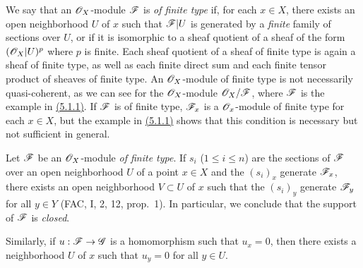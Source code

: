 \begin{env}[5.2.1]
\label{env-0.5.2.1}
We say that an $\mathscr{O}_X$-module $\mathscr{F}$ is {\em of finite type} if, for each $x\in X$, there
exists an open neighborhood $U$ of $x$ such that $\mathscr{F}|U$ is generated by a {\em finite}
family of sections over $U$, or if it is isomorphic to a sheaf quotient of a sheaf of the
form $(\mathscr{O}_X|U)^p$ where $p$ is finite. Each sheaf quotient of a sheaf of finite type is
again a sheaf of finite type, as well as each finite direct sum and each finite tensor
product of sheaves of finite type. An $\mathscr{O}_X$-module of finite type is not necessarily
quasi-coherent, as we can see for the $\mathscr{O}_X$-module $\mathscr{O}_X/\mathscr{F}$, where $\mathscr{F}$ is the
example in \hyperref[env-0.5.1.1]{(5.1.1)}. If $\mathscr{F}$ is of finite type, $\mathscr{F}_x$ is a $\mathscr{O}_x$-module
of finite type for each $x\in X$, but the example in \hyperref[env-0.5.1.1]{(5.1.1)} shows that this
condition is necessary but not sufficient in general.
\end{env}

\begin{env}[5.2.2]
\label{env-0.5.2.2}
Let $\mathscr{F}$ be an $\mathscr{O}_X$-module {\em of finite type}. If $s_i$ ($1\leqslant i\leqslant n$)
are the sections of $\mathscr{F}$ over an open neighborhood $U$ of a point $x\in X$ and the
$(s_i)_x$ generate $\mathscr{F}_x$, there exists an open neighborhood $V\subset U$ of $x$ such
that the $(s_i)_y$ generate $\mathscr{F}_y$ for all $y\in Y$ (FAC, I, 2, 12, prop.~1). In
particular, we conclude that the support of $\mathscr{F}$ is {\em closed}.

Similarly, if $u:\mathscr{F}\to\mathscr{G}$ is a homomorphism such that $u_x=0$, then there exists a
neighborhood $U$ of $x$ such that $u_y=0$ for all $y\in U$.
\end{env}

